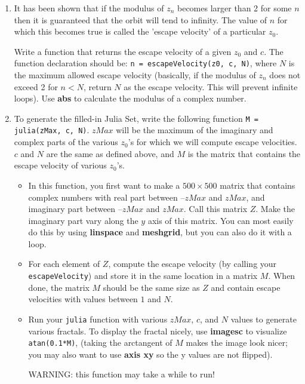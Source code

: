 \documentclass[12pt]{TDTP}
\begin{document}
\begin{enumerate}
\item It has been shown that if the modulus of $z_n$ becomes larger than 2 for some $n$ then it is guaranteed that the orbit will tend to infinity. The value of $n$ for which this becomes true is called the 'escape velocity' of a particular $z_0$. 

Write a function that returns the escape velocity of a given $z_0$ and $c$. The function declaration should be: 
\texttt{n = escapeVelocity(z0, c, N)},
where $N$ is the maximum allowed escape velocity (basically, if the modulus of $z_n$ does not exceed 2 for $n<N$, return $N$ as the escape velocity. This will prevent infinite loops). Use \textbf{abs} to calculate the modulus of a complex number.

\item To generate the filled-in Julia Set, write the following function \texttt{M = julia(zMax, c, N)}.
$zMax$ will be the maximum of the imaginary and complex parts of the various $z_0$'s for which we will compute escape velocities. $c$ and $N$ are the same as defined above, and $M$ is the matrix that contains the escape velocity of various $z_0$'s.
\begin{itemize}
\item In this function, you first want to make a $500 \times 500$ matrix that contains complex numbers with real part between $–zMax$ and $zMax$, and imaginary part between $–zMax$ and $zMax$. 
Call this matrix $Z$. Make the imaginary part vary along the $y$ axis of this matrix. You can most easily do this by using \textbf{linspace} and \textbf{meshgrid}, but you can also do it with a loop.

\item For each element of $Z$, compute the escape velocity (by calling your \texttt{escapeVelocity}) and store it in the same location in a matrix $M$. When done, the matrix $M$ should be the same size as $Z$ and contain escape velocities with values between $1$ and $N$.

\item Run your \texttt{julia} function with various $zMax$, $c$, and $N$ values to generate various fractals.
To display the fractal nicely, use \textbf{imagesc} to visualize \texttt{atan(0.1*M)}, (taking the arctangent of $M$ makes the image look nicer; you may also want to use \textbf{axis xy} so the y values are not flipped). 

WARNING: this function may take a while to run!
\end{itemize}
\end{enumerate}
\end{document}
